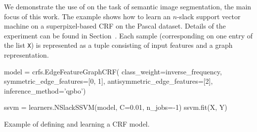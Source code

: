 %

We demonstrate the use of \pystruct on the task of semantic image segmentation,
the main focus of this work. The example shows how to learn an $n$-slack support
vector machine on a superpixel-based CRF on the Pascal dataset. Details of the experiment
can be found in Section~.
Each sample (corresponding on one entry of the list \texttt{X}) is represented as a
tuple consisting of input features and a graph representation.
\begin{listing}[t]
\begin{pythoncode}
model = crfs.EdgeFeatureGraphCRF(
            class_weight=inverse_frequency,
            symmetric_edge_features=[0, 1],
            antisymmetric_edge_features=[2],
            inference_method='qpbo')

ssvm = learners.NSlackSSVM(model, C=0.01, n_jobs=-1)
ssvm.fit(X, Y)
\end{pythoncode}
\caption{Example of defining and learning a CRF model.\label{lst:stuff}}
\end{listing}

